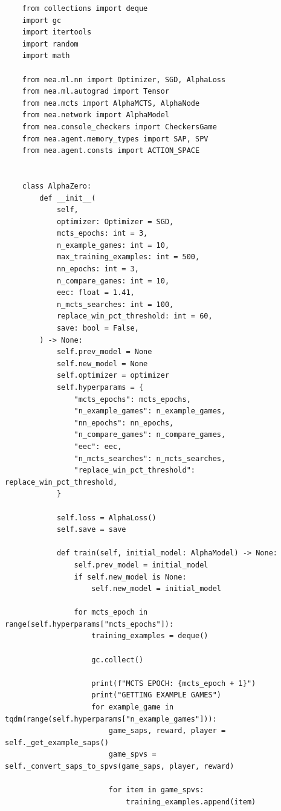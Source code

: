 \documentclass{article}
\makeatletter
\newcommand\subsubsubsection{\@startsection{paragraph}{4}{\z@}{-2.5ex\@plus -1ex \@minus -.25ex}{1.25ex \@plus .25ex}{\normalfont\normalsize\bfseries}}
\makeatother
\begin{document}
    \subsubsubsection{Agent}
    \begin{verbatim}
    from collections import deque
    import gc
    import itertools
    import random
    import math

    from nea.ml.nn import Optimizer, SGD, AlphaLoss
    from nea.ml.autograd import Tensor
    from nea.mcts import AlphaMCTS, AlphaNode
    from nea.network import AlphaModel
    from nea.console_checkers import CheckersGame
    from nea.agent.memory_types import SAP, SPV
    from nea.agent.consts import ACTION_SPACE


    class AlphaZero:
        def __init__(
            self,
            optimizer: Optimizer = SGD,
            mcts_epochs: int = 3,
            n_example_games: int = 10,
            max_training_examples: int = 500,
            nn_epochs: int = 3,
            n_compare_games: int = 10,
            eec: float = 1.41,
            n_mcts_searches: int = 100,
            replace_win_pct_threshold: int = 60,
            save: bool = False,
        ) -> None:
            self.prev_model = None
            self.new_model = None
            self.optimizer = optimizer
            self.hyperparams = {
                "mcts_epochs": mcts_epochs,
                "n_example_games": n_example_games,
                "nn_epochs": nn_epochs,
                "n_compare_games": n_compare_games,
                "eec": eec,
                "n_mcts_searches": n_mcts_searches,
                "replace_win_pct_threshold": replace_win_pct_threshold,
            }

            self.loss = AlphaLoss()
            self.save = save

            def train(self, initial_model: AlphaModel) -> None:
                self.prev_model = initial_model
                if self.new_model is None:
                    self.new_model = initial_model

                for mcts_epoch in range(self.hyperparams["mcts_epochs"]):
                    training_examples = deque()

                    gc.collect()

                    print(f"MCTS EPOCH: {mcts_epoch + 1}")
                    print("GETTING EXAMPLE GAMES")
                    for example_game in tqdm(range(self.hyperparams["n_example_games"])):
                        game_saps, reward, player = self._get_example_saps()
                        game_spvs = self._convert_saps_to_spvs(game_saps, player, reward)

                        for item in game_spvs:
                            training_examples.append(item)


\end{verbatim}
\end{document}
